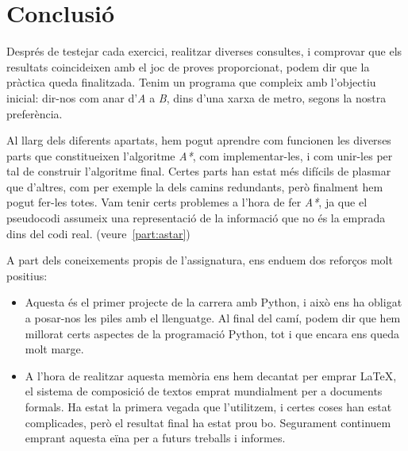 \documentclass[a4paper,12pt,hidelinks]{article}
\begin{document}
    \part{Conclusió}
    \label{part:conclusion}

    Després de testejar cada exercici, realitzar diverses consultes, i comprovar que els resultats coincideixen amb el joc de proves proporcionat, podem dir que la pràctica queda finalitzada.  Tenim un programa que compleix amb l’objectiu inicial: dir-nos com anar d’\textit{A} a \textit{B}, dins d’una xarxa de metro, segons la nostra preferència.

    Al llarg dels diferents apartats, hem pogut aprendre com funcionen les diverses parts que constitueixen l’algoritme \textit{A*}, com implementar-les, i com unir-les per tal de construir l’algoritme final. Certes parts han estat més difícils de plasmar que d’altres, com per exemple la dels camins redundants, però finalment hem pogut fer-les totes.
    Vam tenir certs problemes a l’hora de fer \textit{A*}, ja que el pseudocodi assumeix una representació de la informació que no és la emprada dins del codi real. (veure~\ref{part:astar})

    A part dels coneixements propis de l’assignatura, ens enduem dos reforços molt positius:
    \begin{itemize}
        \item Aquesta és el primer projecte de la carrera amb Python, i això ens ha obligat a posar-nos les piles amb el llenguatge. Al final del camí, podem dir que hem millorat certs aspectes de la programació Python, tot i que encara ens queda molt marge.
        \item A l’hora de realitzar aquesta memòria ens hem decantat per emprar \LaTeX, el sistema de composició de textos emprat mundialment per a documents formals. Ha estat la primera vegada que l'utilitzem, i certes coses han estat complicades, però el resultat final ha estat prou bo. Segurament continuem emprant aquesta eïna per a futurs treballs i informes.
    \end{itemize}
 
\end{document}
